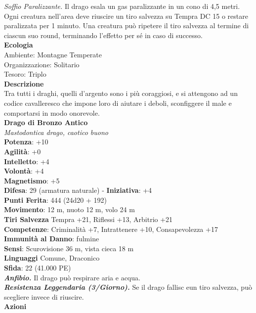 \begin{multicols}{2}
\emph{Soffio Paralizzante.} Il drago esala un gas paralizzante in un cono di 4,5 metri. Ogni creatura nell'area deve riuscire un tiro salvezza su Tempra DC  15 o restare paralizzata per 1 minuto. Una creatura può ripetere il tiro salvezza al termine di ciascun suo round, terminando l'effetto per sé in caso di successo.\\
\textbf{Ecologia}\\
Ambiente: Montagne Temperate\\
Organizzazione: Solitario\\
Tesoro: Triplo\\
\textbf{Descrizione}\\
Tra tutti i draghi, quelli d’argento sono i più coraggiosi, e si attengono ad un codice cavalleresco che impone loro di aiutare i deboli, sconfiggere il male e comportarsi in modo onorevole.\\
\medskip\textbf{Drago di Bronzo Antico}\\
\emph{Mastodontica drago, caotico buono}\\
\textbf{Potenza}: +10\\
\textbf{Agilità}: +0\\
\textbf{Intelletto}: +4\\
\textbf{Volontà}: +4\\
\textbf{Magnetismo}: +5\\
\textbf{Difesa}: 29 (armatura naturale) - \textbf{Iniziativa}: +4\\
\textbf{Punti Ferita}: 444 (24d20 + 192)\\
\textbf{Movimento}: 12 m, nuoto 12 m, volo 24 m\\
\textbf{Tiri Salvezza} Tempra +21, Riflessi +13, Arbitrio +21\\
\textbf{Competenze}: Criminalità +7, Intrattenere +10, Consapevolezza +17\\
\textbf{Immunità al Danno}: fulmine\\
\textbf{Sensi}: Scurovisione 36 m, vista cieca 18 m\\
\textbf{Linguaggi} Comune, Draconico\\
\textbf{Sfida}: 22 (41.000 PE)\smallskip\\
\emph{\textbf{Anfibio.}} Il drago può respirare aria e acqua.\\
\emph{\textbf{Resistenza Leggendaria (3/Giorno).}} Se il drago fallisc eun tiro salvezza, può scegliere invece di riuscire. \\
\smallskip\textbf{Azioni}\\

\end{multicols}

